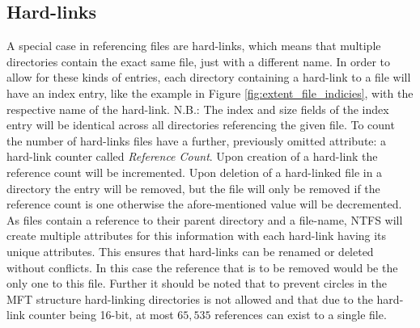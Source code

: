 \subsection{Hard-links}
A special case in referencing files are hard-links, which means that multiple directories contain the exact same file, just with a different name. In order to allow for these kinds of entries, each directory containing a hard-link to a file will have an index entry, like the example in Figure \ref{fig:extent_file_indicies}, with the respective name of the hard-link. N.B.: The index and size fields of the index entry will be identical across all directories referencing the given file. To count the number of hard-links files have a further, previously omitted attribute: a hard-link counter called \textit{Reference Count}. Upon creation of a hard-link the reference count will be incremented. Upon deletion of a hard-linked file in a directory the entry will be removed, but the file will only be removed if the reference count is one \cite{inv:NLD:2018} otherwise the afore-mentioned value will be decremented. As files contain a reference to their parent directory and a file-name, NTFS will create multiple attributes for this information with each hard-link having its unique attributes. This ensures that hard-links can be renamed or deleted without conflicts\cite{joscon:HHW:2011}. In this case the reference that is to be removed would be the only one to this file. Further it should be noted that to prevent circles in the MFT structure hard-linking directories is not allowed \cite{inv:NLD:2018} and that due to the hard-link counter being 16-bit\cite{inv:NLD:2018}, at most $65,535$ references can exist to a single file.
